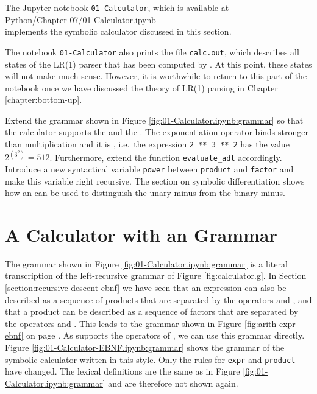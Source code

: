 The Jupyter notebook \texttt{01-Calculator}, which is available at
\\[0.2cm]
\hspace*{1.3cm}
\href{https://github.com/karlstroetmann/Formal-Languages/blob/master/Python/Chapter-07/01-Calculator.ipynb}{Python/Chapter-07/01-Calculator.ipynb}
\\[0.2cm]
implements the symbolic calculator discussed in this section.

\remarkEng
The notebook \texttt{01-Calculator} also prints the file \texttt{calc.out}, which describes all states of the
LR(1) parser that has been computed by .  At this point, these states will not make much
sense.  However, it is worthwhile to return to this part of the notebook once we have discussed the theory of
LR(1) parsing in Chapter \ref{chapter:bottom-up}.  \eox

\exerciseEng
Extend the grammar shown in Figure \ref{fig:01-Calculator.ipynb:grammar} so that the calculator supports
the  \squoted{**} and the .  The exponentiation operator
binds stronger than multiplication and it is , i.e.~the expression
\texttt{2 ** 3 ** 2} has the value $2^{(3^2)} = 512$.  Furthermore, extend the function
\texttt{evaluate\_adt} accordingly.
\\[0.2cm]
\hint
Introduce a new syntactical variable \texttt{power} between \texttt{product} and \texttt{factor} and make
this variable right recursive.  The section on symbolic differentiation shows how an  can be used
to distinguish the unary minus from the binary minus.

\section{A Calculator with an \texorpdfstring{}{EBNF} Grammar  \label{section:calculator-ebnf}}
The grammar shown in Figure \ref{fig:01-Calculator.ipynb:grammar} is a literal transcription of the
left-recursive grammar of Figure \ref{fig:calculator.g}.  In Section \ref{section:recursive-descent-ebnf} we
have seen that an expression can also be described as a sequence of products that are separated by the
operators \squoted{+} and \squoted{-}, and that a product can be described as a sequence of factors that are
separated by the operators \squoted{*} and \squoted{/}.  This leads to the  grammar shown in
Figure \ref{fig:arith-expr-ebnf} on page \pageref{fig:arith-expr-ebnf}.  As  supports
the operators of , we can use this grammar directly.  Figure
\ref{fig:01-Calculator-EBNF.ipynb:grammar} shows the grammar of the symbolic calculator written in this
style.  Only the rules for \texttt{expr} and \texttt{product} have changed.  The lexical definitions are the
same as in Figure \ref{fig:01-Calculator.ipynb:grammar} and are therefore not shown again.

